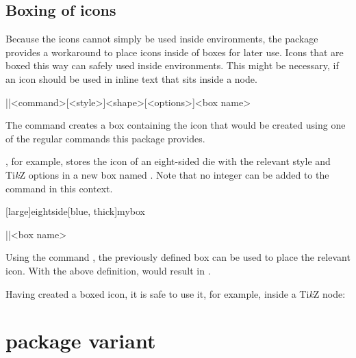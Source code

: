 \documentclass[a4paper]{article}
\begin{document}
\subsection{Boxing of icons}

Because the icons cannot simply be used inside  environments, the package provides a workaround to place icons inside of boxes for later use. Icons that are boxed this way can safely used inside  environments. This might be necessary, if an icon should be used in inline text that sits inside a node.

\begin{macrodef}|\provideprotecteddndicon|{<command>}[<style>]{<shape>}[<options>]{<box name>}\end{macrodef}
The command \macro{\provideprotecteddndicon} creates a box containing the icon that would be created using one of the regular commands this package provides. 

, for example, stores the icon of an eight-sided die with the relevant style and Ti\emph{k}Z options in a new box named . Note that no integer can be added to the  command in this context.

[large]{eightside}[blue, thick]{mybox}

\begin{macrodef}|\useprotecteddndicon|{<box name>}\end{macrodef}
Using the command \macro{\useprotecteddndicon}, the previously defined box can be used to place the relevant icon. With the above definition,  would result in .

Having created a boxed icon, it is safe to use it, for example, inside a Ti\emph{k}Z node:

\begin{codeexample}
\end{codeexample}


\RenewCommandCopy\die\DndiconsDie
\RenewCommandCopy\ability\DndiconsAbility

\section[l3draw package variant]{ package variant}
\end{document}
